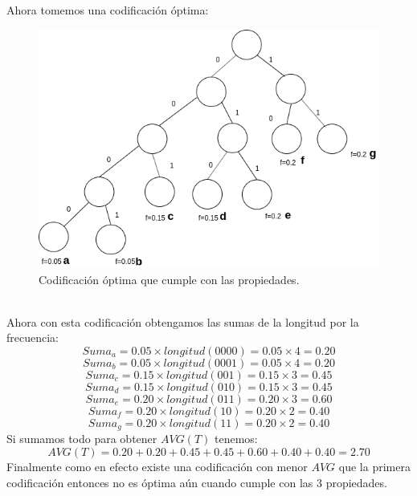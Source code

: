 \documentclass[12pt]{article}
\begin{document}
\subsection{}
Ahora tomemos una codificación óptima:
\begin{figure}[h]
	\begin{center}
		\includegraphics[scale=0.7]{codificacion2}
	\end{center}
	\caption{Codificación óptima que cumple con las propiedades.}
\end{figure}
\\
Ahora con esta codificación obtengamos las sumas de la longitud por la frecuencia:
\begin{equation}
Suma_a = 0.05 \times longitud(0000) = 0.05 \times 4 = 0.20
\end{equation}
\begin{equation}
Suma_b = 0.05 \times longitud(0001) = 0.05 \times 4 = 0.20
\end{equation}
\begin{equation}
Suma_c = 0.15 \times longitud(001) = 0.15 \times 3 = 0.45
\end{equation}
\begin{equation}
Suma_d = 0.15 \times longitud(010) = 0.15 \times 3 = 0.45
\end{equation}
\begin{equation}
Suma_e = 0.20 \times longitud(011) = 0.20 \times 3 = 0.60
\end{equation}
\begin{equation}
Suma_f = 0.20 \times longitud(10) = 0.20 \times 2 = 0.40
\end{equation}
\begin{equation}
Suma_g = 0.20 \times longitud(11) = 0.20 \times 2 = 0.40
\end{equation}
Si sumamos todo para obtener $AVG(T)$ tenemos:
\begin{equation}
AVG(T)= 0.20 + 0.20 + 0.45  + 0.45 + 0.60  + 0.40 + 0.40= 2.70
\end{equation}
Finalmente como en efecto existe una codificación con menor $AVG$ que la primera codificación entonces no es óptima aún cuando cumple con las 3 propiedades.
\end{document}
